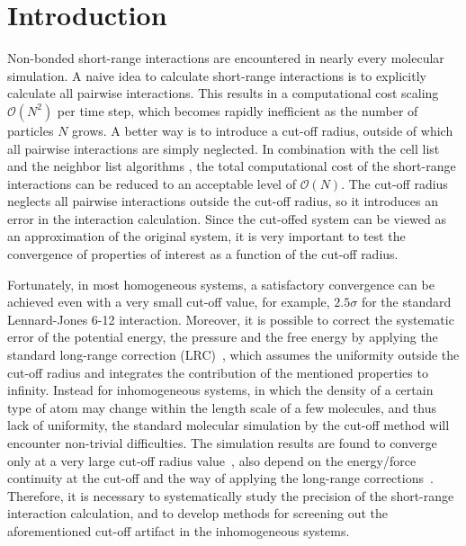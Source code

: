 \documentclass[preprint]{revtex4}
\begin{document}
\section{Introduction}
Non-bonded short-range interactions are encountered in nearly every
molecular simulation.  A naive idea to calculate short-range
interactions is to explicitly calculate all pairwise
interactions. This results in a computational cost scaling $\mathcal
O(N^2)$ per time step, which becomes rapidly inefficient as the number
of particles $N$ grows. A better way is to introduce a cut-off
radius, outside of which all pairwise interactions are simply
neglected. In combination with the cell list and the neighbor list
algorithms \cite{frenkel02b}, the total computational cost of the
short-range interactions can be reduced to an acceptable level of
$\mathcal O(N)$.  The cut-off radius neglects all pairwise interactions
outside the cut-off radius, so it introduces an error in the interaction
calculation. Since the cut-offed system can be viewed as an approximation of
the original system, it is very important to test the
convergence of properties of interest as a function of the cut-off
radius.

Fortunately,
in most homogeneous systems, a satisfactory convergence can be
achieved even with a very small cut-off value, for example,
$2.5\sigma$ for the standard Lennard-Jones 6-12 interaction.
Moreover, it is possible to correct the systematic error
of the potential energy, the pressure and the free energy by applying
the standard long-range correction (LRC)~\cite{allen87a}, which
assumes the uniformity outside the cut-off radius and integrates the
contribution of the mentioned properties to infinity. 
Instead for inhomogeneous systems, in which the density of a certain type of
atom may change within the length scale of a few molecules, 
and thus lack of uniformity, 
the standard molecular simulation 
by the cut-off method will encounter non-trivial
difficulties.
The simulation results are found to converge only at a very large
cut-off radius value~\cite{duque2004some, ismail2007application}, also
depend on the energy/force continuity at the cut-off and the way of
applying the long-range corrections~\cite{trokhymchuk1999computer,
  guo1997long, mecke1997molecular, janecek2006long, goujon2004monte,
  shen2007comparative}.  Therefore, it is necessary to systematically
study the precision of the short-range interaction calculation, and to
develop methods for screening out the aforementioned cut-off artifact in
the inhomogeneous systems.
\end{document}
